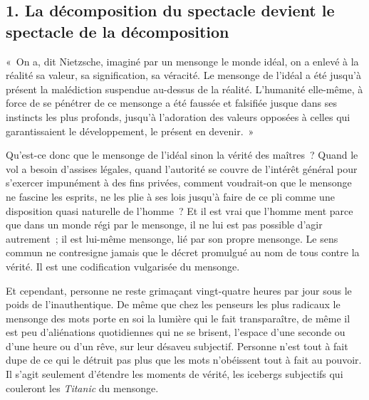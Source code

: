 \documentclass[french,twoside]{book} %
\newcommand{\astermono}{\medskip\centerline{\color{rubric}\large\selectfont{\syms ✻}}\medskip\par}%
\newenvironment{quoteblock}%
  {\begin{quoting}}
  {\end{quoting}}
\newenvironment{quotebar}{%
    \def\FrameCommand{{\color{rubric!10!}\vrule width 0.5em} \hspace{0.9em}}%
    \def\OuterFrameSep{\itemsep} %
    \MakeFramed {\advance\hsize-\width \FrameRestore}
  }%
  {%
    \endMakeFramed
  }
\renewenvironment{quoteblock}%
  {%
    \savenotes
    \setstretch{0.9}
    \normalfont
    \begin{quotebar}
  }
  {%
    \end{quotebar}
    \spewnotes
  }
\begin{document}
\subsection[{1. La décomposition du spectacle devient le spectacle de la décomposition}]{\textsc{1.} La décomposition du spectacle devient le spectacle de la décomposition}

\begin{quoteblock}
\noindent « On a, dit Nietzsche, imaginé par un mensonge le monde idéal, on a enlevé à la réalité sa valeur, sa signification, sa véracité. Le mensonge de l’idéal a été jusqu’à présent la malédiction suspendue au-dessus de la réalité. L’humanité elle-même, à force de se pénétrer de ce mensonge a été faussée et falsifiée jusque dans ses instincts les plus profonds, jusqu’à l’adoration des valeurs opposées à celles qui garantissaient le développement, le présent en devenir. »\end{quoteblock}

\noindent Qu’est-ce donc que le mensonge de l’idéal sinon la vérité des maîtres ? Quand le vol a besoin d’assises légales, quand l’autorité se couvre de l’intérêt général pour s’exercer impunément à des fins privées, comment voudrait-on que le mensonge ne fascine les esprits, ne les plie à ses lois jusqu’à faire de ce pli comme une disposition quasi naturelle de l’homme ? Et il est vrai que l’homme ment parce que dans un monde régi par le mensonge, il ne lui est pas possible d’agir autrement ; il est lui-même mensonge, lié par son propre mensonge. Le sens commun ne contresigne jamais que le décret promulgué au nom de tous contre la vérité. Il est une codification vulgarisée du mensonge.\par
Et cependant, personne ne reste grimaçant vingt-quatre heures par jour sous le poids de l’inauthentique. De même que chez les penseurs les plus radicaux le mensonge des mots porte en soi la lumière qui le fait transparaître, de même il est peu d’aliénations quotidiennes qui ne se brisent, l’espace d’une seconde ou d’une heure ou d’un rêve, sur leur désaveu subjectif. Personne n’est tout à fait dupe de ce qui le détruit pas plus que les mots n’obéissent tout à fait au pouvoir. Il s’agit seulement d’étendre les moments de vérité, les icebergs subjectifs qui couleront les \emph{Titanic} du mensonge.\par

\astermono
\end{document}
